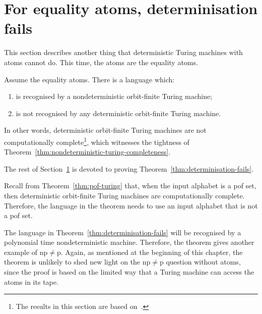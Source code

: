 \section{For equality atoms, determinisation fails}
\label{sec:triangles}

This section describes another thing that deterministic Turing machines with atoms cannot do. This time, the atoms are the equality atoms. 



 
\begin{theorem}\label{thm:determinisation-fails}
 Assume the equality atoms. There is a language which:
 \begin{enumerate}
 \item is recognised by a nondeterministic orbit-finite Turing machine;
 \item is not recognised by any deterministic orbit-finite Turing machine.
 \end{enumerate}
\end{theorem}

In other words, deterministic orbit-finite Turing machines are not computationally complete\footnote{The results in this section are based on~\cite{DBLP:conf/lics/BojanczykKLT13}.}, which witnesses the tightness of Theorem~\ref{thm:nondeterministic-turing-completeness}.

The rest of Section~\ref{sec:triangles} is devoted to proving Theorem~\ref{thm:determinisation-fails}. 

Recall from Theorem~\ref{thm:pof-turing} that, when the input alphabet is a pof set, then deterministic orbit-finite Turing machines are computationally complete. Therefore, the language in the theorem needs to use an input alphabet that is not a pof set. 

The language in Theorem~\ref{thm:determinisation-fails} will be recognised by a polynomial time nondeterministic machine. Therefore, the theorem gives another example of {\sc np}$\neq${\sc p}. Again, as mentioned at the beginning of this chapter, the theorem is unlikely to shed new light on the {\sc np}$\neq${\sc p} question without atoms, since the proof is based on the limited way that a Turing machine can access the atoms in its tape.

\newcommand{\sixtup}{T}
\newcommand{\approxclass}[1]{[#1]_{\approx}}
\newcommand{\quot}{\sixtup\!/_{\sim}}
\newcommand{\dquot}{\sixtup\!/_{\approx}}
\newcommand{\ldquot}{L_{\approx}}
\newcommand{\flip}{\mathrm{flip}}
\newcommand{\eighttup}{\atoms^{(8)}}
\newcommand{\simtiles}{\eighttup_{/\approx}}





